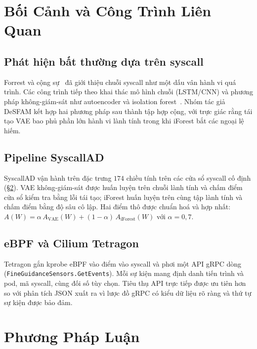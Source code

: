 \FloatBarrier
\section{Bối Cảnh và Công Trình Liên Quan}
\label{sec:background_vi}

\subsection{Phát hiện bất thường dựa trên syscall}
Forrest và cộng sự~\cite{forrest1996} đã giới thiệu chuỗi syscall như
một dấu vân hành vi quá trình. Các công trình tiếp theo khai thác mô
hình chuỗi (LSTM/CNN) và phương pháp không-giám-sát như autoencoder và
isolation forest~\cite{ref38_nimos,ref27_optimus}. Nhóm tác giả DeSFAM
kết hợp hai phương pháp sau thành tập hợp cộng, với trực giác rằng
tái tạo VAE bao phủ phần lớn hành vi lành tính trong khi iForest bắt
các ngoại lệ hiếm.

\subsection{Pipeline SyscallAD}
SyscallAD vận hành trên đặc trưng $174$ chiều tính trên các cửa sổ
syscall cố định (\S\ref{sec:methodology_vi}). VAE không-giám-sát được
huấn luyện trên chuỗi lành tính và chấm điểm cửa sổ kiểm tra bằng lỗi
tái tạo; iForest huấn luyện trên cùng tập lành tính và chấm điểm bằng
độ sâu cô lập. Hai điểm thô được chuẩn hoá và hợp nhất:
$A(W) = \alpha\,A_{\text{VAE}}(W) + (1-\alpha)\,A_{\text{iForest}}(W)$
với $\alpha=0{,}7$.

\subsection{eBPF và Cilium Tetragon}
Tetragon gắn kprobe eBPF vào điểm vào syscall và phơi một API gRPC
dòng (\texttt{FineGuidanceSensors.GetEvents}). Mỗi sự kiện mang định
danh tiến trình và pod, mã syscall, cùng đối số tùy chọn. Tiêu thụ
API trực tiếp được ưu tiên hơn so với phân tích JSON xuất ra vì lược
đồ gRPC có kiểu dữ liệu rõ ràng và thứ tự sự kiện được bảo đảm.

\FloatBarrier
\section{Phương Pháp Luận}
\label{sec:methodology_vi}

